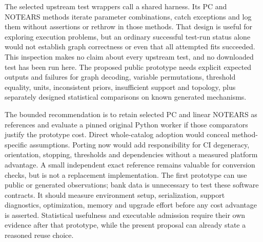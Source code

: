 The selected upstream test wrappers call a shared harness. Its PC and NOTEARS
methods iterate parameter combinations, catch exceptions and log them without
assertions or rethrow in those methods. That design is useful for exploring
execution problems, but an ordinary successful test-run status alone would not
establish graph correctness or even that all attempted fits succeeded. This
inspection makes no claim about every upstream test, and no downloaded test has
been run here. The proposed public prototype needs explicit expected outputs and
failures for graph decoding, variable permutations, threshold equality, units,
inconsistent priors, insufficient support and topology, plus separately designed
statistical comparisons on known generated mechanisms.
\citep{exec20_gcastle_source,exec20_gcastle_reference}

The bounded recommendation is to retain selected PC and linear NOTEARS as
references and evaluate a pinned original Python worker if those comparators
justify the prototype cost. Direct whole-catalog adoption would conceal
method-specific assumptions. Porting now would add responsibility for CI
degeneracy, orientation, stopping, thresholds and dependencies without a measured
platform advantage. A small independent exact reference remains valuable for
conversion checks, but is not a replacement implementation. The first prototype
can use public or generated observations; bank data is unnecessary to test these
software contracts. It should measure environment setup, serialization, support
diagnostics, optimization, memory and upgrade effort before any cost advantage
is asserted. Statistical usefulness and executable admission require their own
evidence after that prototype, while the present proposal can already state a
reasoned reuse choice.
